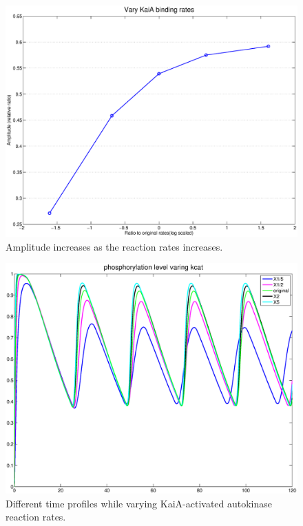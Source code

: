 \documentclass[a4paper,10pt]{article}
\numberwithin{equation}{section}
\begin{document}
\begin{figure}[H]
\centering
\includegraphics[scale=0.4]{tempcomp7.eps}
\caption{\selectfont Amplitude increases as the reaction rates increases.}\label{fig:ampvary}
\end{figure}


\begin{figure}[H]
\centering
\includegraphics[scale=0.4]{tempcomp5.eps}
\caption{\selectfont Different time profiles while varying KaiA-activated autokinase reaction rates.}
\label{fig:varycat}
\end{figure}
\end{document}

